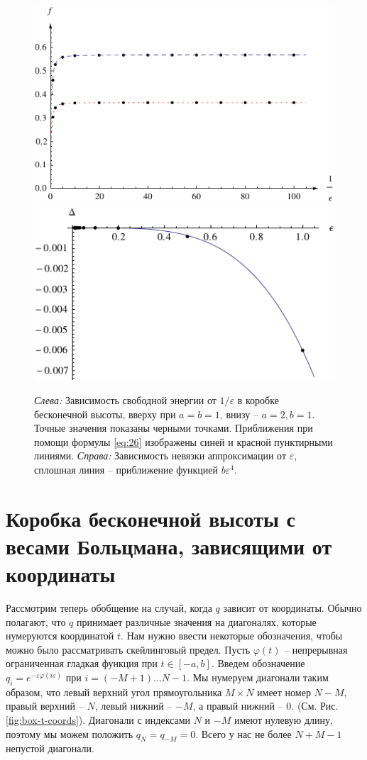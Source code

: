 \documentclass{article}
\begin{document}
\begin{figure}[htbp]
  \includegraphics[scale=0.8]{exact-vs-approximation-2d}
  \includegraphics[scale=0.9]{error-2d}
  \caption{\label{fig:approx-acc-2d} {\it Слева:} Зависимость свободной энергии от  $1/\varepsilon$
    в коробке бесконечной высоты, вверху при $a=b=1$, внизу -- $a=2, b=1$. Точные значения показаны
    черными точками. Приближения при помощи формулы \eqref{eq:26} изображены синей и красной
    пунктирными линиями. {\it Справа:} Зависимость невязки аппроксимации от  $\varepsilon$, сплошная
    линия -- приближение функцией $b\varepsilon^{4}$.}
\end{figure}

\section{Коробка бесконечной высоты с весами Больцмана, зависящими от координаты}
\label{sec:box-infinite-height}

Рассмотрим теперь обобщение на случай, когда  $q$ зависит от координаты. Обычно полагают, что  $q$
принимает различные значения на диагоналях, которые нумеруются координатой $t$. Нам нужно ввести
некоторые обозначения, чтобы можно было рассматривать скейлинговый предел. Пусть  $\varphi(t)$ --
непрерывная ограниченная гладкая функция при  $t\in\left[-a,b\right]$. Введем обозначение
$q_{i}=e^{-\varepsilon \varphi\left(i\varepsilon\right)}$ при $i=(-M+1)\dots N-1$. Мы нумеруем
диагонали таким образом, что левый верхний угол прямоугольника $M\times N$ имеет номер $N-M$, правый
верхний -- $N$, левый нижний -- $-M$, а правый нижний -- $0$. (См. Рис. \ref{fig:box-t-coords}).
Диагонали с индексами  $N$ и $-M$ имеют нулевую длину, поэтому мы можем положить $q_{N}=q_{-M}=0$.
Всего у нас не более $N+M-1$ непустой диагонали. 
\end{document}
